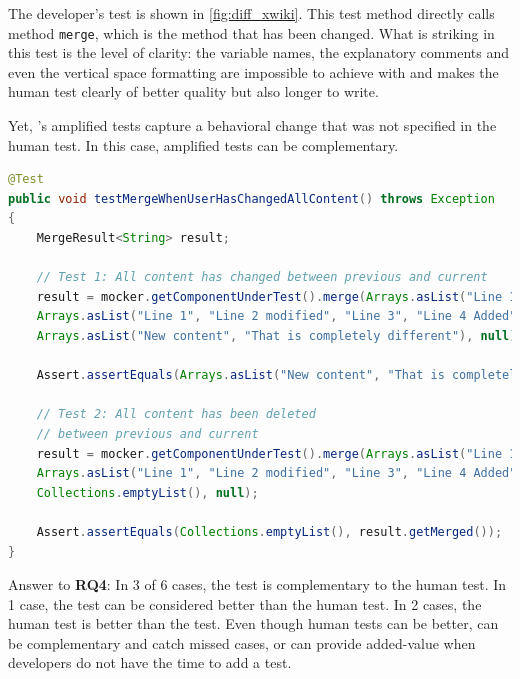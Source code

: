 The developer's test is shown in \autoref{fig:diff_xwiki}.
This test method directly calls method \texttt{merge}, which is the method that has been changed. 
What is striking in this test is the level of clarity: 
the variable names, the explanatory comments and even the vertical space formatting are impossible to achieve with \DCIA and makes the human test clearly of better quality but also longer to write.

Yet, \DCIA's amplified tests capture a behavioral change that was not specified in the human test.
In this case, amplified tests can be complementary.

\begin{lstlisting}[language=java,caption=Developer test for \textsc{d3101ae} of XWiki.,label=fig:diff_xwiki]
@Test
public void testMergeWhenUserHasChangedAllContent() throws Exception
{
	MergeResult<String> result;

	// Test 1: All content has changed between previous and current
	result = mocker.getComponentUnderTest().merge(Arrays.asList("Line 1", "Line 2", "Line 3"),
	Arrays.asList("Line 1", "Line 2 modified", "Line 3", "Line 4 Added"),
	Arrays.asList("New content", "That is completely different"), null);

	Assert.assertEquals(Arrays.asList("New content", "That is completely different"), result.getMerged());

	// Test 2: All content has been deleted 
	// between previous and current
	result = mocker.getComponentUnderTest().merge(Arrays.asList("Line 1", "Line 2", "Line 3"),
	Arrays.asList("Line 1", "Line 2 modified", "Line 3", "Line 4 Added"),
	Collections.emptyList(), null);

	Assert.assertEquals(Collections.emptyList(), result.getMerged());
}
\end{lstlisting}


\begin{mdframed}
Answer to \textbf{RQ4}: 
In 3 of 6 cases, the \DCI test is complementary to the human test.
In 1 case, the \DCI test can be considered better than the human test.
In 2 cases, the human test is better than the \DCI test.
Even though human tests can be better, \DCI can be complementary and catch missed cases, or can provide added-value when developers do not have the time to add a test.
\end{mdframed}

